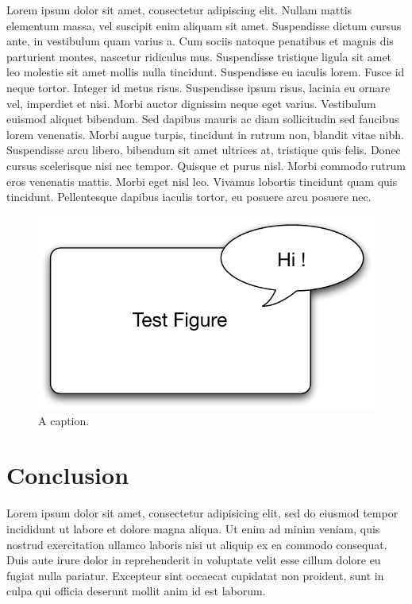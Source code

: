 \documentclass{chi-ext}
\begin{document}
\begin{multicols}{2}
\begin{flushleft}
Lorem ipsum dolor sit amet, consectetur adipiscing elit. Nullam mattis elementum massa, vel suscipit
enim aliquam sit amet. Suspendisse dictum cursus ante, in vestibulum quam varius a. Cum sociis
natoque penatibus et magnis dis parturient montes, nascetur ridiculus mus. Suspendisse tristique
ligula sit amet leo molestie sit amet mollis nulla tincidunt. Suspendisse eu iaculis lorem. Fusce id
neque tortor. Integer id metus risus. Suspendisse ipsum risus, lacinia eu ornare vel, imperdiet et
nisi. Morbi auctor dignissim neque eget varius. Vestibulum euismod aliquet bibendum. Sed dapibus
mauris ac diam sollicitudin sed faucibus lorem venenatis. Morbi augue turpis, tincidunt in rutrum
non, blandit vitae nibh. Suspendisse arcu libero, bibendum sit amet ultrices at, tristique quis
felis. Donec cursus scelerisque nisi nec tempor. Quisque et purus nisl. Morbi commodo rutrum eros
venenatis mattis. Morbi eget nisl leo. Vivamus lobortis tincidunt quam quis tincidunt. Pellentesque
dapibus iaculis tortor, eu posuere arcu posuere nec.

\begin{figure}
 \includegraphics[width=\columnwidth]{figure.pdf}
 \caption{A caption.}
 \label{fig:figure}
\end{figure}


\section{Conclusion}

Lorem ipsum dolor sit amet, consectetur adipisicing elit, sed do eiusmod tempor incididunt ut labore
et dolore magna aliqua. Ut enim ad minim veniam, quis nostrud exercitation ullamco laboris nisi ut
aliquip ex ea commodo consequat. Duis aute irure dolor in reprehenderit in voluptate velit esse
cillum dolore eu fugiat nulla pariatur. Excepteur sint occaecat cupidatat non proident, sunt in
culpa qui officia deserunt mollit anim id est laborum.




\end{flushleft}

\end{multicols}
\end{document}
